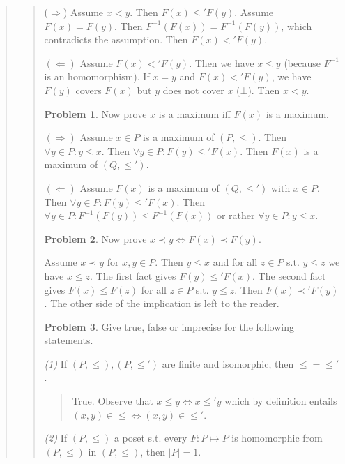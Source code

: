 \documentclass[a4paper, 12pt]{article}
\theoremstyle{definition}
\newtheorem{problem}{Problem}
\theoremstyle{definition}
\theoremstyle{definition}
\begin{document}
\begin{quote}
\begin{quote}
($\Rightarrow$) Assume $x < y$. Then $F(x) \leq' F(y)$. Assume $F(x) = F(y)$.
Then $F^{-1}(F(x)) = F^{-1}(F(y))$, which contradicts the assumption. Then $F(x) <'
F(y)$.

$(\Leftarrow)$ Assume $F(x) <' F(y)$. Then we have $x \leq y$ (because $F^{-1}$
is an homomorphism). If $x = y$ and $F(x) <' F(y)$, we have $F(y)$ covers $F(x)$
but $y$ does not cover $x$ ($\bot$). Then $x < y$.

\begin{problem}
    Now prove $x$ is a maximum iff $F(x)$ is a maximum.
\end{problem}

$(\Rightarrow)$ Assume $x \in P$ is a maximum of $(P, \leq) $. Then $\forall y
\in P : y \leq x$. Then $\forall y \in P: F(y) \leq' F(x)$. Then $F(x)$ is a
maximum of $(Q, \leq') $.

$(\Leftarrow)$ Assume $F(x)$ is a maximum of $(Q, \leq') $ with $x \in P$. Then
$\forall y \in P : F(y) \leq' F(x)$. Then $\forall y \in P : F^{-1} \left( F(y)
\right) \leq F^{-1} \left( F(x) \right) $ or rather $\forall y \in  P : y \leq
x$.

\begin{problem}
    Now prove $x \prec y \iff F(x) \prec F(y)$.
\end{problem}

Assume $x \prec y$ for $x, y \in P$. Then $y \leq x$ and for all $z \in P$ s.t.
$y \leq z$ we have $x \leq z$. The first fact gives $F(y) \leq' F(x)$. The
second fact gives $F(x) \leq F(z)$ for all $z \in P$ s.t. $y \leq z$. Then $F(x)
\prec' F(y)$ . The other side of the implication is left to the reader.

\begin{problem}
    Give true, false or imprecise for the following statements.
\end{problem}

\textit{(1)} If $(P, \leq) , (P, \leq') $ are finite and isomorphic, then $\leq
= \leq'$.

\begin{quote}
    True. Observe that $x \leq y \iff x \leq' y$ which by definition entails
    $(x, y) \in  \leq \iff (x, y) \in  \leq'$.
\end{quote}

\textit{(2)} If $(P, \leq) $ a poset s.t. every $F : P \mapsto P$ is
homomorphic from $(P, \leq) $ in $(P, \leq) $, then $|P| = 1$.

\begin{quote}


\end{quote}
\end{quote}
\end{quote}
\end{document}
